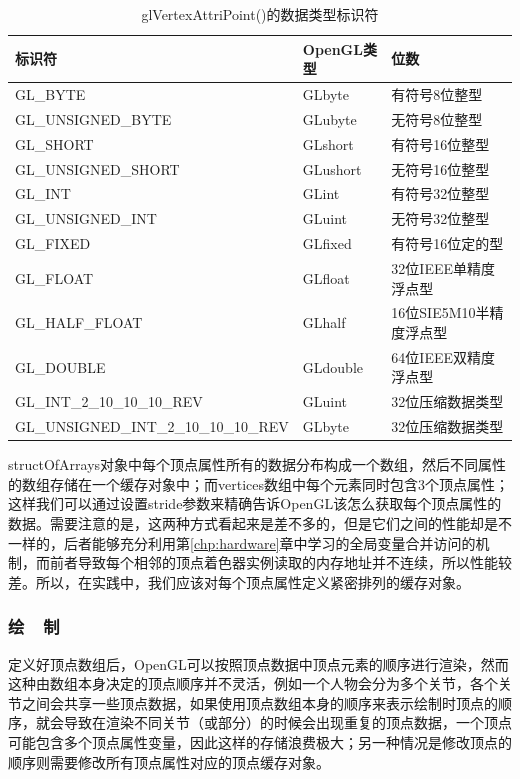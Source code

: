 \begin{table}
\caption{glVertexAttriPoint()的数据类型标识符}
\label{t:api-glVertexAttribPointer-type}
\centering
\begin{tabular}{>{\small}p{}|>{\small}p{}|>{\small}p{}}
\hline 
   标识符 & OpenGL类型 & 位数  \\
    \hline  
  GL\_BYTE  							&GLbyte   & 有符号8位整型\\
  GL\_UNSIGNED\_BYTE  					&GLubyte  & 无符号8位整型\\
  GL\_SHORT  							&GLshort  & 有符号16位整型\\
  GL\_UNSIGNED\_SHORT  					&GLushort & 无符号16位整型\\
  GL\_INT  								&GLint    & 有符号32位整型\\
  GL\_UNSIGNED\_INT  					&GLuint   & 无符号32位整型\\
  GL\_FIXED  							&GLfixed  & 有符号16位定的型\\
  GL\_FLOAT                             &GLfloat  & 32位IEEE单精度浮点型\\
  GL\_HALF\_FLOAT                       &GLhalf   & 16位SIE5M10半精度浮点型\\
  GL\_DOUBLE                            &GLdouble & 64位IEEE双精度浮点型\\
  GL\_INT\_2\_10\_10\_10\_REV           &GLuint   & 32位压缩数据类型\\
  GL\_UNSIGNED\_INT\_2\_10\_10\_10\_REV &GLbyte   & 32位压缩数据类型\\


 \hline 
\end{tabular}
\end{table}


structOfArrays对象中每个顶点属性所有的数据分布构成一个数组，然后不同属性的数组存储在一个缓存对象中；而vertices数组中每个元素同时包含3个顶点属性；这样我们可以通过设置stride参数来精确告诉OpenGL该怎么获取每个顶点属性的数据。需要注意的是，这两种方式看起来是差不多的，但是它们之间的性能却是不一样的，后者能够充分利用第\ref{chp:hardware}章中学习的全局变量合并访问的机制，而前者导致每个相邻的顶点着色器实例读取的内存地址并不连续，所以性能较差。所以，在实践中，我们应该对每个顶点属性定义紧密排列的缓存对象。






\subsubsection{绘~~制}
定义好顶点数组后，OpenGL可以按照顶点数据中顶点元素的顺序进行渲染，然而这种由数组本身决定的顶点顺序并不灵活，例如一个人物会分为多个关节，各个关节之间会共享一些顶点数据，如果使用顶点数组本身的顺序来表示绘制时顶点的顺序，就会导致在渲染不同关节（或部分）的时候会出现重复的顶点数据，一个顶点可能包含多个顶点属性变量，因此这样的存储浪费极大；另一种情况是修改顶点的顺序则需要修改所有顶点属性对应的顶点缓存对象。

